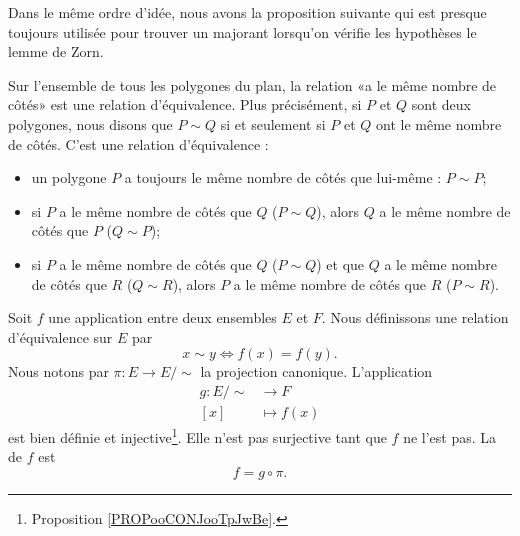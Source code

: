 Dans le même ordre d'idée, nous avons la proposition suivante qui est presque toujours utilisée pour trouver un majorant lorsqu'on vérifie les hypothèses le lemme de Zorn.


\begin{example}     \label{EXooYDRVooHsANlC}
	Sur l'ensemble de tous les polygones du plan, la relation «a le même nombre de côtés» est une relation d'équivalence. Plus précisément, si \( P\) et \( Q\) sont deux polygones, nous disons que \( P\sim Q\) si et seulement si \( P\) et \( Q\) ont le même nombre de côtés. C'est une relation d'équivalence :
	\begin{itemize}
		\item
		      un polygone \( P\) a toujours le même nombre de côtés que lui-même : \( P\sim P\);
		\item
		      si \( P\) a le même nombre de côtés que \( Q\) (\( P\sim Q\)), alors \( Q\) a le même nombre de côtés que \( P\) (\( Q\sim P\));
		\item
		      si \( P\) a le même nombre de côtés que \( Q\) (\( P\sim Q\)) et que \( Q\) a le même nombre de côtés que \( R\) (\( Q\sim R\)), alors \( P\) a le même nombre de côtés que \( R\) (\( P\sim R\)).
	\end{itemize}
\end{example}

\begin{example}\label{EXooProjCanoniqueEquivAppl}
	Soit \( f\) une application entre deux ensembles \( E\) et \( F\). Nous définissons une relation d'équivalence sur \( E\) par
	\begin{equation}
		x\sim y\Leftrightarrow f(x)=f(y).
	\end{equation}
	Nous notons par \( \pi\colon E\to E/\sim\) la projection canonique. L'application
	\begin{equation}
		\begin{aligned}
			g\colon E/\sim & \to F        \\
			[x]            & \mapsto f(x)
		\end{aligned}
	\end{equation}
	est bien définie et injective\footnote{Proposition \ref{PROPooCONJooTpJwBe}.}. Elle n'est pas surjective tant que \( f\) ne l'est pas. La  de \( f\) est
	\begin{equation}
		f=g\circ\pi.
	\end{equation}
\end{example}

